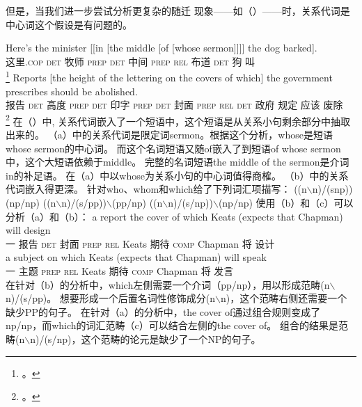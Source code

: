 但是，当我们进一步尝试分析更复杂的随迁
现象——如（）——时，关系代词是中心词这个假设是有问题的。

\eal
\ex\label{Beispiel-Minister}
\gll Here's the         minister [[in                         [the                  middle [of [whose sermon]]]] the dog barked]. \\
     这里.\textsc{cop} \textsc{det} 牧师      \hspaceThis{[[}\textsc{prep} \spacebr\textsc{det} 中间     \spacebr\textsc{prep} \textsc{rel} 布道 \textsc{det} 狗 叫 \\
\footnote{。}
\ex 
\gll Reports [the                 height of           the           lettering on            the          covers of which] the government prescribes should be abolished.\\
     报告     \spacebr\textsc{det} 高度   \textsc{prep} \textsc{det} 印字       \textsc{prep} \textsc{det} 封面    \textsc{prep} \textsc{rel} \textsc{det} 政府 规定 应该 \passive{} 废除 \\
\label{Ross-reports}\footnote{。\nocite{Ross86a-u}}
\zl
在（）中, 关系代词嵌入了一个短语中，这个短语是从关系小句剩余部分中抽取出来的。
（a）中的关系代词是限定词sermon。根据这个分析，whose是短语whose sermon的中心词。
而这个名词短语又随of嵌入了到短语of whose sermon中，这个大短语依赖于middle。
完整的名词短语the middle of the sermon是介词in的补足语。
在（a）中以whose为关系小句的中心词值得商榷。
（b）中的关系代词嵌入得更深。
 \citet[]{Steedman97a}针对who、whom和which给了下列词汇项描写：
\eal
\label{le-relpron-Steedman}
\settowidth{}
\ex ((n$\backslash$n)/(s\bs np))\bs (np/np)       
\ex ((n$\backslash$n)/(s/pp))$\backslash$(pp/np)  
\ex ((n$\backslash$n)/(s/np))$\backslash$(np/np)  
\zl
使用（b）和（c）可以分析（a）和（b）：
\eal
\ex 
\gll a report the cover of which Keats (expects that Chapman) will design\\
一 报告 \textsc{det} 封面 \textsc{prep} \textsc{rel} Keats 期待 \textsc{comp} Chapman 将 设计\\
\ex 
\gll a subject on which Keats (expects that Chapman) will speak\\
一 主题 \textsc{prep} \textsc{rel} Keats 期待 \textsc{comp} Chapman 将 发言\\
\zl
在针对（b）的分析中，which左侧需要一个介词（pp/np），用以形成范畴(n$\backslash$n)/(s/pp)。
想要形成一个后置名词性修饰成分(n$\backslash$n)，这个范畴右侧还需要一个缺少PP的句子。
在针对（a）的分析中，the cover of通过组合规则变成了np/np，而which的词汇范畴（c）可以结合左侧的the cover of。
组合的结果是范畴(n$\backslash$n)/(s/np)，这个范畴的论元是缺少了一个NP的句子。


